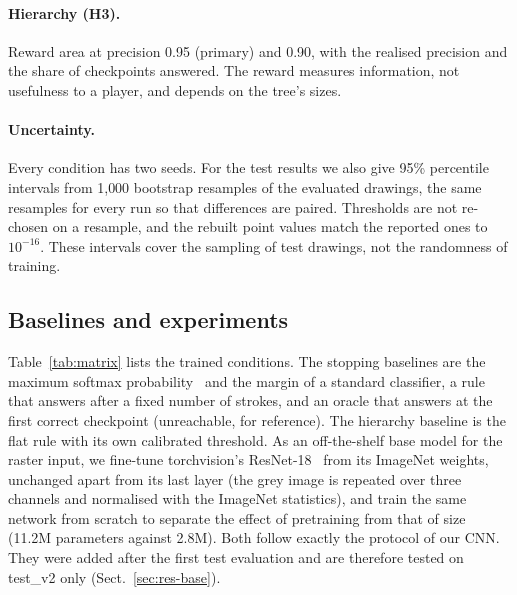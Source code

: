 \paragraph{Hierarchy (H3).} Reward area at precision 0.95 (primary) and 0.90, with the realised
precision and the share of checkpoints answered. The reward measures information, not usefulness
to a player, and depends on the tree's sizes.
\paragraph{Uncertainty.} Every condition has two seeds. For the test results we also give 95\%
percentile intervals from 1{,}000 bootstrap resamples of the evaluated drawings, the same resamples
for every run so that differences are paired. Thresholds are not re-chosen on a resample, and the
rebuilt point values match the reported ones to $10^{-16}$. These intervals cover the sampling of
test drawings, not the randomness of training.

\subsection{Baselines and experiments}
\label{sec:setup-matrix}
Table~\ref{tab:matrix} lists the trained conditions. The stopping baselines are the maximum
softmax probability~\cite{hendrycks2017baseline} and the margin of a standard classifier, a rule
that answers after a fixed number of strokes, and an oracle that answers at the first correct
checkpoint (unreachable, for reference). The hierarchy baseline is the flat rule with its own
calibrated threshold. As an off-the-shelf base model for the raster input, we fine-tune
torchvision's ResNet-18~\cite{he2016resnet} from its ImageNet weights, unchanged apart from its last
layer (the grey image is repeated over three channels and normalised with the ImageNet statistics),
and train the same network from scratch to separate the effect of pretraining from that of size
(11.2M parameters against 2.8M). Both follow exactly the protocol of our CNN. They were added after
the first test evaluation and are therefore tested on test\_v2 only (Sect.~\ref{sec:res-base}).


